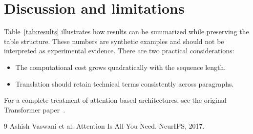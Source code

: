 \documentclass[11pt]{article}
\begin{document}
\section{Discussion and limitations}
Table~\ref{tab:results} illustrates how results can be summarized while preserving the table structure. These numbers are synthetic examples and should not be interpreted as experimental evidence. There are two practical considerations:
\begin{itemize}
\item The computational cost grows quadratically with the sequence length.
\item Translation should retain technical terms consistently across paragraphs.
\end{itemize}
For a complete treatment of attention-based architectures, see the original Transformer paper~\cite{vaswani2017attention}.
\begin{thebibliography}{9}
 Ashish Vaswani et al. Attention Is All You Need. NeurIPS, 2017.
\end{thebibliography}
\end{document}
